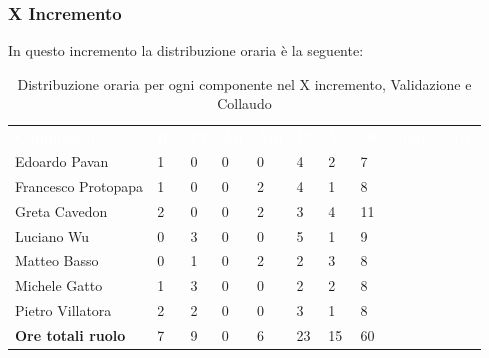 \subsubsection{X Incremento}
In questo incremento la distribuzione oraria è la seguente:
\begin{table}[H]
\begin{center}
\renewcommand{\arraystretch}{1.25}
\begin{tabular}{ m{}<{\centering}  m{}<{\centering} m{}<{\centering} m{}<{\centering}  m{}<{\centering}  m{}<{\centering}  m{}<{\centering}  m{}<{\centering}   }
	\rowcolor{darkblue}
	\textcolor{white}{\textbf{Componente}} &\textcolor{white}{\textbf{Re}}&\textcolor{white}{\textbf{Pt}}&\textcolor{white}{\textbf{An}}&\textcolor{white}{\textbf{Am}}&\textcolor{white}{\textbf{Pr}}&\textcolor{white}{\textbf{Ve}}&\textcolor{white}{\textbf{Ore complessive}}\\ 
	Edoardo Pavan & 1 & 0 & 0 & 0 & 4 & 2 & 7 \\	
	
	Francesco Protopapa & 1 & 0 & 0 & 2 & 4 & 1 & 8 \\

	Greta Cavedon & 2 & 0 & 0 & 2 & 3 & 4 & 11 \\
	
	Luciano Wu & 0 & 3 & 0 & 0 & 5 & 1 & 9 \\
	
	Matteo Basso & 0 & 1 & 0 & 2 & 2 & 3 & 8 \\
	
	Michele Gatto & 1 & 3 & 0 & 0 & 2 & 2 & 8 \\
	
	Pietro Villatora & 2 & 2 & 0 & 0 & 3 & 1 & 8 \\
	
	\textbf{Ore totali ruolo} & 7 & 9 & 0 & 6 & 23 & 15 & 60 \\

\end{tabular}
\caption{Distribuzione oraria per ogni componente nel X incremento, Validazione e Collaudo}
\end{center}
\end{table}

